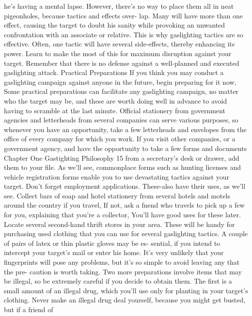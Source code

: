 \documentclass{book}
\begin{document}
he's having a mental lapse. However, there's no way to place 
them all in neat pigeonholes, because tactics and effects over- 
lap. Many will have more than one effect, causing the target to 
doubt his sanity while provoking an unwanted confrontation 
with an associate or relative. 
This is why gaslighting tactics are so effective. Often, one 
tactic will have several side-effects, thereby enhancing its 
power. Learn to make the most of this for maximum disruption 
against your target. Remember that there is no defense against a 
well-planned and executed gaslighting attack. 
Practical Preparations 
If you think you may conduct a gaslighting campaign 
against anyone in the future, begin preparing for it now, Some 
practical preparations can facilitate any gaslighting campaign, 
no matter who the target may be, and these are worth doing well 
in advance to avoid having to scramble at the last minute. 
Official stationery from government agencies and 
letterheads from several companies can serve various purposes, 
so whenever you have an opportunity, take a few letterheads 
and envelopes from the office of every company for which you 
work. If you visit other companies, or a government agency, 
and have the opportunity to take a few forms and documents 
Chapter One 
Gastighting Philosophy 
15 
from a secretary's desk or drawer, add them to your file. As 
we'll see, commonplace forms such as hunting licenses and 
vehicle registration forms enable you to use devastating tactics 
against your target. 
Don't forget employment applications. These-also have their 
uses, as we'll see. 
Collect bars of soap and hotel stationery from several hotels 
and motels around the country if you travel, If not, ask a fnend 
who travels to pick up a few for you, explaining that you're a 
collector, You'll have good uses for these later. 
Locate several second-hand thrift stores in your area. These 
will be handy for purchasing used clothing that you can use for 
several gaslighting tactics. 
A couple of pairs of latex or thin plastic gloves may be es- 
sential, if you intend to intercept your target's mail or enter his 
home. It's very unlikely that your fingerprints will pose any 
problems, but it's so simple to avoid leaving any that the pre- 
caution is worth taking. 
Two more preparations involve items that may be illegal, so 
be extremely careful if you decide to obtain them. The first is a 
small amount of an illegal drug, which you'll use only for 
planting in your target's clothing. Never make an illegal drug 
deal yourself, because you might get busted, but if a friend of 
\end{document}
